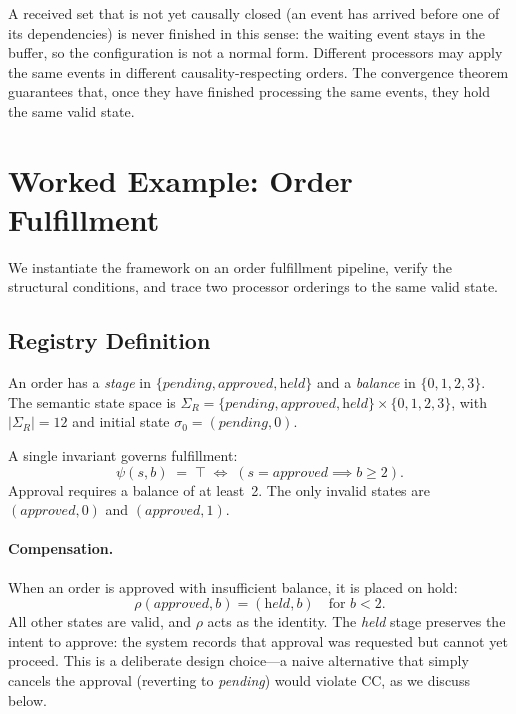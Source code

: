 \documentclass[11pt,a4paper]{article}
\theoremstyle{plain}
\theoremstyle{definition}
\theoremstyle{remark}
\begin{document}
A received set that is not yet causally closed (an event has arrived before
one of its dependencies) is never finished in this sense: the waiting event
stays in the buffer, so the configuration is not a normal form.  Different processors may apply the same events in different
causality-respecting orders.  The convergence theorem guarantees that, once
they have finished processing the same events, they hold the same valid state.

\section{Worked Example: Order Fulfillment}
\label{sec:example}

We instantiate the framework on an order fulfillment pipeline, verify the
structural conditions, and trace two processor orderings to the same valid
state.

\subsection{Registry Definition}

An order has a \emph{stage} in $\{\textit{pending}, \textit{approved},
\textit{held}\}$ and a \emph{balance} in $\{0, 1, 2, 3\}$.  The semantic
state space is $\Sigma_R = \{\textit{pending}, \textit{approved},
\textit{held}\} \times \{0, 1, 2, 3\}$, with $|\Sigma_R| = 12$ and initial
state $\sigma_0 = (\textit{pending}, 0)$.

A single invariant governs fulfillment:
\[
\psi(s, b) \;=\; \top \;\iff\; (s = \textit{approved} \implies b \geq 2).
\]
Approval requires a balance of at least~2.  The only invalid states are
$(\textit{approved}, 0)$ and $(\textit{approved}, 1)$.

\paragraph{Compensation.}
When an order is approved with insufficient balance, it is placed on hold:
\[
\rho(\textit{approved}, b) = (\textit{held}, b) \quad \text{for } b < 2.
\]
All other states are valid, and $\rho$ acts as the identity.  The
\textit{held} stage preserves the intent to approve: the system records that
approval was requested but cannot yet proceed.  This is a deliberate design
choice---a naive alternative that simply cancels the approval (reverting to
\textit{pending}) would violate CC, as we discuss below.
\end{document}
